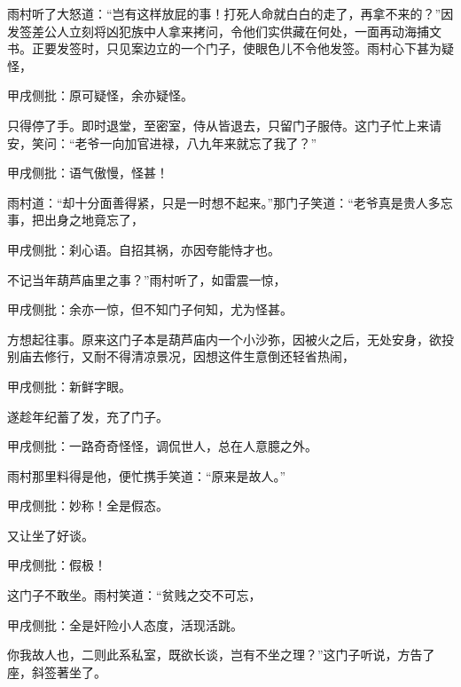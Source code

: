 \begin{parag}
    雨村听了大怒道：“岂有这样放屁的事！打死人命就白白的走了，再拿不来的？”因发签差公人立刻将凶犯族中人拿来拷问，令他们实供藏在何处，一面再动海捕文书。正要发签时，只见案边立的一个门子，使眼色儿不令他发签。雨村心下甚为疑怪，\begin{note}甲戌侧批：原可疑怪，余亦疑怪。\end{note}只得停了手。即时退堂，至密室，侍从皆退去，只留门子服侍。这门子忙上来请安，笑问：“老爷一向加官进禄，八九年来就忘了我了？”\begin{note}甲戌侧批：语气傲慢，怪甚！\end{note}雨村道：“却十分面善得紧，只是一时想不起来。”那门子笑道：“老爷真是贵人多忘事，把出身之地竟忘了，\begin{note}甲戌侧批：刹心语。自招其祸，亦因夸能恃才也。\end{note}不记当年葫芦庙里之事？”雨村听了，如雷震一惊，\begin{note}甲戌侧批：余亦一惊，但不知门子何知，尤为怪甚。\end{note}方想起往事。原来这门子本是葫芦庙内一个小沙弥，因被火之后，无处安身，欲投别庙去修行，又耐不得清凉景况，因想这件生意倒还轻省热闹，\begin{note}甲戌侧批：新鲜字眼。\end{note}遂趁年纪蓄了发，充了门子。\begin{note}甲戌侧批：一路奇奇怪怪，调侃世人，总在人意臆之外。\end{note}雨村那里料得是他，便忙携手笑道：“原来是故人。”\begin{note}甲戌侧批：妙称！全是假态。\end{note}又让坐了好谈。\begin{note}甲戌侧批：假极！\end{note}这门子不敢坐。雨村笑道：“贫贱之交不可忘，\begin{note}甲戌侧批：全是奸险小人态度，活现活跳。\end{note}你我故人也，二则此系私室，既欲长谈，岂有不坐之理？”这门子听说，方告了座，斜签著坐了。
\end{parag}


